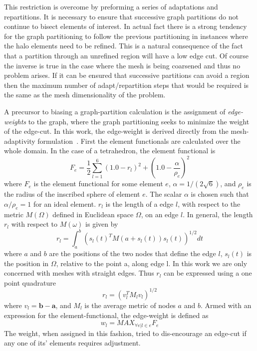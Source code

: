\documentclass[11pt]{article}
\begin{document}
This restriction is overcome by preforming a series of adaptations and
repartitions. It is necessary to ensure that successive graph
partitions do not continue to bisect elements of interest. In actual
fact there is a strong tendency for the graph partitioning to follow
the previous partitioning in instances where the halo elements need to
be refined. This is a natural consequence of the fact that a partition
through an unrefined region will have a low edge cut. Of course the
inverse is true in the case where the mesh is being coarsened and thus
no problem arises. If it can be ensured that successive partitions can
avoid a region then the maximum number of adapt/repartition steps that
would be required is the same as the mesh dimensionality of the
problem.

A precursor to biasing a graph-partition calculation is the
assignment of {\it edge-weights} to the graph, where the graph
partitioning seeks to minimize the weight of the edge-cut.  In this
work, the edge-weight is derived directly from the mesh-adaptivity
formulation~\cite{adapt}. First the element functionals are calculated
over the whole domain. In the case of a tetrahedron, the element
functional is
\begin{equation}
F_e = \frac{1}{2}\sum_{l=1}^{6}\left(1.0 - r_l \right)^2 + \left( 1.0 - \frac{\alpha}{\rho_e} \right)^2
\end{equation}
where $F_e$ is the element functional for some element $e$, $\alpha =
1/(2\sqrt{6})$, and $\rho_e$ is the radius of the inscribed sphere of
element $e$. The scalar $\alpha$ is chosen such that $\alpha/\rho_e =
1$ for an ideal element. $r_l$ is the length of a edge $l$, with
respect to the metric $M(\Omega)$ defined in Euclidean space $\Omega$,
on an edge $l$. In general, the length $r_l$ with respect to
$M(\omega)$ is given by
\begin{equation}
r_l = \int_a^b \left( s_l(t)^T M(a + s_l(t)) s_l(t) \right)^{1/2} dt
\end{equation}
where $a$ and $b$ are the positions of the two nodes that define the
edge $l$, $s_l(t)$ is the position in $\Omega$, relative to the point
a, along edge l. In this work we are only concerned with meshes with
straight edges. Thus $r_l$ can be expressed using a one point
quadrature
\begin{equation}
r_l = \left(v_l^T M_l v_l \right)^{1/2}
\end{equation}
where $v_l = \pmb{b} - \pmb{a}$, and $M_l$ is the average metric of
nodes $a$ and $b$.
Armed with an expression for the element-functional, the edge-weight is defined as
\begin{equation}
w_l = MAX_{\forall e|l\in e}F_e
\end{equation}
The weight, when assigned in this fashion, tried to dis-encourage an
edge-cut if any one of its' elements requires adjustment.
\end{document}
